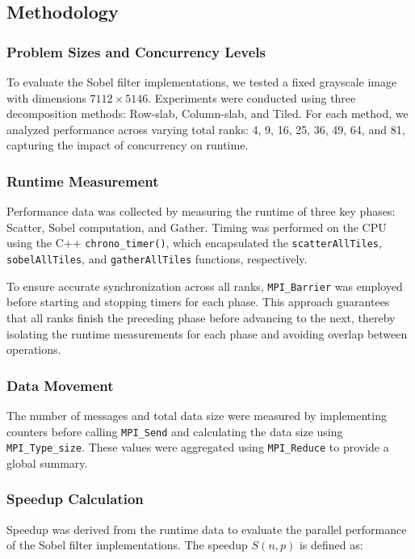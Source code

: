 \subsection{Methodology}
\label{subsec:methodology}

\subsubsection{Problem Sizes and Concurrency Levels}
\label{subsubsec:problem-size}
To evaluate the Sobel filter implementations, we tested a fixed grayscale image with dimensions \(7112 \times 5146\). Experiments were conducted using three decomposition methods: Row-slab, Column-slab, and Tiled. For each method, we analyzed performance across varying total ranks: 4, 9, 16, 25, 36, 49, 64, and 81, capturing the impact of concurrency on runtime.

\subsubsection{Runtime Measurement}
\label{subsubsec:runtime}
Performance data was collected by measuring the runtime of three key phases: Scatter, Sobel computation, and Gather. Timing was performed on the CPU using the C++ \texttt{chrono\_timer()}, which encapsulated the \texttt{scatterAllTiles}, \texttt{sobelAllTiles}, and \texttt{gatherAllTiles} functions, respectively. 

To ensure accurate synchronization across all ranks, \texttt{MPI\_Barrier} was employed before starting and stopping timers for each phase. This approach guarantees that all ranks finish the preceding phase before advancing to the next, thereby isolating the runtime measurements for each phase and avoiding overlap between operations.

\subsubsection{Data Movement}
\label{subsubsec:data-movement}
The number of messages and total data size were measured by implementing counters before calling \texttt{MPI\_Send} and calculating the data size using \texttt{MPI\_Type\_size}. These values were aggregated using \texttt{MPI\_Reduce} to provide a global summary.

\subsubsection{Speedup Calculation}
\label{subsubsec:speedup}
Speedup was derived from the runtime data to evaluate the parallel performance of the Sobel filter implementations. The speedup \(S(n, p)\) is defined as:

